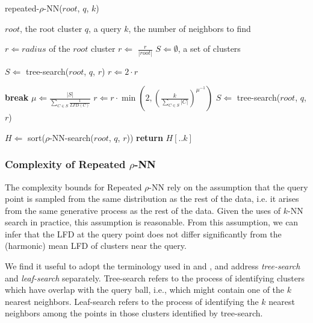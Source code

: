\begin{algorithm} %
    \caption{repeated-$\rho$-NN($root$, $q$, $k$)} %
    \label{alg:knn:repeated-rnn} %
    \begin{algorithmic} %
        \REQUIRE $root$, the root cluster
        \REQUIRE $q$, a query
        \REQUIRE $k$, the number of neighbors to find

        \STATE $r \Leftarrow radius$ of the $root$ cluster
        \STATE $r \Leftarrow$ $\frac{r}{|root|}$
        \STATE $S \Leftarrow \emptyset$, a set of clusters

            \STATE $S \Leftarrow$ tree-search($root$, $q$, $r$)
            \STATE $r \Leftarrow 2 \cdot r$
        \ENDWHILE

        \ALOOP{}
                \STATE \textbf{break}
            \ENDIF
            \STATE $\mu \Leftarrow \frac{|S|}{\sum_{C \in S} \frac{1}{LFD(C)}}$
            \STATE $r \Leftarrow r \cdot \min \left( 2, \left( {\frac{k}{\sum_{C \in S} |C|}} \right)^{\mu^{-1}} \right)$
            \STATE $S \Leftarrow$ tree-search($root$, $q$, $r$)
        \ENDLOOP

        \STATE $H \Leftarrow$ sort($\rho$-NN-search($root$, $q$, $r$))
        \STATE \textbf{return} $H[.. k]$
    \end{algorithmic}
\end{algorithm}


\subsubsection{Complexity of Repeated \texorpdfstring{$\rho$}{p}-NN}
\label{subsubsec:methods:repeated-rnn-complexity}

The complexity bounds for Repeated $\rho$-NN rely on the assumption that the query point is sampled from the same distribution as the rest of the data, i.e. it arises from the same generative process as the rest of the data.
Given the uses of $k$-NN search in practice, this assumption is reasonable.
From this assumption, we can infer that the LFD at the query point does not differ significantly from the (harmonic) mean LFD of clusters near the query.

We find it useful to adopt the terminology used in \cite{ishaq2019clustered} and \cite{yu2015entropy}, and address \emph{tree-search} and \emph{leaf-search} separately.
Tree-search refers to the process of identifying clusters which have overlap with the query ball, i.e., which might contain one of the $k$ nearest neighbors. 
Leaf-search refers to the process of identifying the $k$ nearest neighbors among the points in those clusters identified by tree-search.

